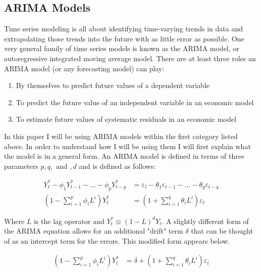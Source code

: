 \documentclass[a4paper, 11pt, twoside]{article}
\newcommand\ve{\varepsilon} %
\theoremstyle{definition} %
\numberwithin{equation}{section}
\begin{document}
  \newpage
  \subsection{ARIMA Models} \label{sub:arima}

    Time series modeling is all about identifying time-varying trends in data and extrapolating those trends into the future with as little error as possible. One very general family of time series models is known as the ARIMA model, or autoregressive integrated moving average model. There are at least three roles an ARIMA model (or any forecasting model) can play:

    \begin{enumerate}
      \item By themselves to predict future values of a dependent variable
      \item To predict the future value of an independent variable in an economic model
      \item To estimate future values of systematic residuals in an economic model
    \end{enumerate}

    In this paper I will be using ARIMA models within the first category listed above. In order to understand how I will be using them I will first explain what the model is in a general form. An ARIMA model is defined in terms of three parameters $p, q, \text{ and }, d$ and is defined as follows:

    \begin{align}
     Y_t^* - \phi_1Y_{t-1}^*  - \dots - \phi_pY_{t-p}^* &= \ve_t - \theta_1\ve_{t-1} - \dots - \theta_q \ve_{t-q} \label{eq:arimalong}\\
     \left( 1 - \sum_{i=1}^p \phi_i L^i\right) Y_t^* &= \left( 1 + \sum_{i=1} ^q \theta_i L^i \right) \ve_t \label{eq:arima}
    \end{align}

    Where $L$ is the lag operator and $Y_t^* \equiv (1 - L)^d Y_t$. A slightly different form of the ARIMA equation allows for an additional "drift" term $ \delta$ that can be thought of as an intercept term for the errors. This modified form appears below.

    \begin{align}
      \left( 1 - \sum_{i=1}^p \phi_i L^i\right) Y_t^* &= \delta + \left( 1 + \sum_{i=1} ^q \theta_i L^i \right) \ve_t \label{eq:arimadrift}
    \end{align}
\end{document}

